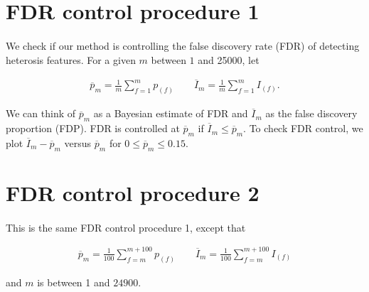 \documentclass{article}
\providecommand{\ov}[1]{\overline{#1}}
\begin{document}
\begin{flushleft}
\section{FDR control procedure 1}

\paragraph{} We check if our method is controlling the false discovery rate (FDR) of detecting heterosis features. For a given $m$ between $1$ and 25000, let

\begin{align*}
\ov{p}_m = \frac{1}{m} \sum_{f = 1}^m p_{(f)} \qquad \ov{I}_m = \frac{1}{m}\sum_{f = 1}^m I_{(f)}.
\end{align*}

We can think of $\ov{p}_m$ as a Bayesian estimate of FDR and $\ov{I}_m$ as the false discovery proportion (FDP). FDR is controlled at $\ov{p}_m$ if $\ov{I}_m \le \ov{p}_m$. To check FDR control, we plot $\ov{I}_m - \ov{p}_m$ versus $\ov{p}_m$ for $0 \le \ov{p}_m \le 0.15$.

\section{FDR control procedure 2}

\paragraph{} This is the same FDR control procedure 1, except that

\begin{align*}
\ov{p}_m = \frac{1}{100} \sum_{f = m}^{m + 100} p_{(f)} \qquad \ov{I}_m = \frac{1}{100}\sum_{f = m}^{m + 100} I_{(f)}
\end{align*}

and $m$ is between 1 and $24900$.

\end{flushleft}



\end{document}
